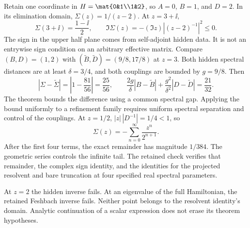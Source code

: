 Retain one coordinate in $H=\mat{0&1\\1&2}$, so $A=0$, $B=1$, and $D=2$. In its elimination domain, $\Sigma(z)=1/(z-2)$. At $z=3+\ii$,
\[
\Sigma(3+\ii)=\frac{1-\ii}{2},\qquad
\Im\Sigma(z)=-(\Im z)\left|(z-2)^{-1}\right|^2\leq0.
\]
The sign in the upper half plane comes from self-adjoint hidden data. It is not an entrywise sign condition on an arbitrary effective matrix.
Compare $(B,D)=(1,2)$ with $(\widetilde B,\widetilde D)=(9/8,17/8)$ at $z=3$. Both hidden spectral distances are at least $\delta=3/4$, and both couplings are bounded by $g=9/8$. Then
\[
|\Sigma-\widetilde\Sigma|=\left|1-\frac{81}{56}\right|=\frac{25}{56},
\qquad
\frac{2g}{\delta}|B-\widetilde B|
+\frac{g^2}{\delta^2}|D-\widetilde D|=\frac{21}{32}.
\]
The theorem bounds the difference using a common spectral gap. Applying the bound uniformly to a refinement family requires uniform spectral separation and control of the couplings.
At $z=1/2$, $|z|\,|D^{-1}|=1/4<1$, so
\[
\Sigma(z)=-\sum_{n=0}^{\infty}\frac{z^n}{2^{n+1}}.
\]
After the first four terms, the exact remainder has magnitude $1/384$. The geometric series controls the infinite tail. The retained check verifies that remainder, the complex sign identity, and the identities for the projected resolvent and bare truncation at four specified real spectral parameters.

At $z=2$ the hidden inverse fails. At an eigenvalue of the full Hamiltonian, the retained Feshbach inverse fails. Neither point belongs to the resolvent identity's domain. Analytic continuation of a scalar expression does not erase its theorem hypotheses.

